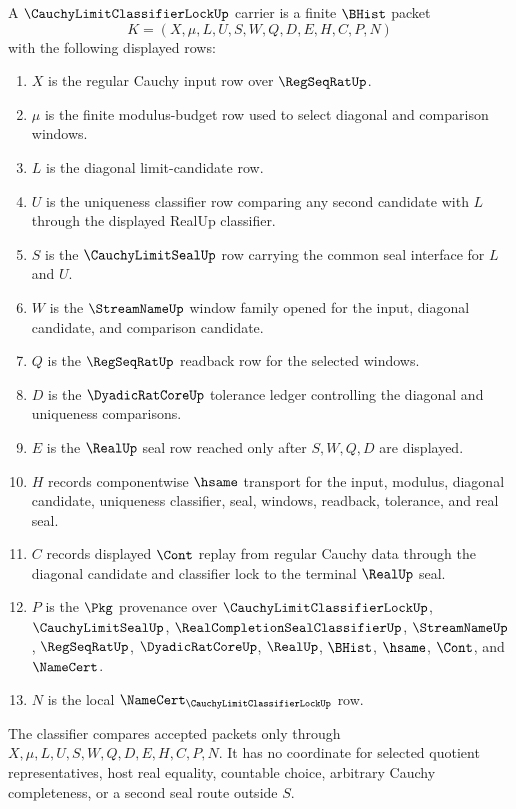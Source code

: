 \begin{definition}
\label{def:cauchy-limit-classifier-lock-carrier}
A $\CauchyLimitClassifierLockUp$ carrier is a finite $\BHist$ packet
$$
K=(X,\mu,L,U,S,W,Q,D,E,H,C,P,N)
$$
with the following displayed rows:
\begin{enumerate}
\item $X$ is the regular Cauchy input row over $\RegSeqRatUp$.
\item $\mu$ is the finite modulus-budget row used to select diagonal and comparison windows.
\item $L$ is the diagonal limit-candidate row.
\item $U$ is the uniqueness classifier row comparing any second candidate with $L$ through the displayed RealUp classifier.
\item $S$ is the $\CauchyLimitSealUp$ row carrying the common seal interface for $L$ and $U$.
\item $W$ is the $\StreamNameUp$ window family opened for the input, diagonal candidate, and comparison candidate.
\item $Q$ is the $\RegSeqRatUp$ readback row for the selected windows.
\item $D$ is the $\DyadicRatCoreUp$ tolerance ledger controlling the diagonal and uniqueness comparisons.
\item $E$ is the $\RealUp$ seal row reached only after $S,W,Q,D$ are displayed.
\item $H$ records componentwise $\hsame$ transport for the input, modulus, diagonal candidate, uniqueness classifier, seal, windows, readback, tolerance, and real seal.
\item $C$ records displayed $\Cont$ replay from regular Cauchy data through the diagonal candidate and classifier lock to the terminal $\RealUp$ seal.
\item $P$ is the $\Pkg$ provenance over $\CauchyLimitClassifierLockUp$, $\CauchyLimitSealUp$, $\RealCompletionSealClassifierUp$, $\StreamNameUp$, $\RegSeqRatUp$, $\DyadicRatCoreUp$, $\RealUp$, $\BHist$, $\hsame$, $\Cont$, and $\NameCert$.
\item $N$ is the local $\NameCert_{\CauchyLimitClassifierLockUp}$ row.
\end{enumerate}
The classifier compares accepted packets only through $X,\mu,L,U,S,W,Q,D,E,H,C,P,N$. It has no coordinate for selected quotient representatives, host real equality, countable choice, arbitrary Cauchy completeness, or a second seal route outside $S$.
\end{definition}

